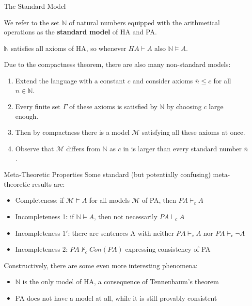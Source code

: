 \documentclass[xcolor=dvipsnames,aspectratio=169,handout]{beamer}
\newcommand{\MM}{\mathcal{M}}
\begin{document}
\begin{frame}{The Standard Model}
	\pause
	\begin{definition}
		We refer to the set $\mathbb N$ of natural numbers equipped with the arithmetical operations as the \textbf{standard model} of HA and PA.
	\end{definition}
	
	\pause
	\begin{fact}
		$\mathbb N$ satisfies all axioms of HA, so whenever $HA\vdash A$ also $\mathbb N\vDash A$.
	\end{fact}
	
	\pause
	\vspace{0.3cm}
	Due to the compactness theorem, there are also many non-standard models:
	\begin{enumerate}
		\pause
		\item
		Extend the language with a constant $c$ and consider axioms $\overline n\le c$ for all $n\in \mathbb N$.
		\pause
		\item
		Every finite set $\Gamma$ of these axioms is satisfied by $\mathbb N$ by choosing $c$ large enough.
		\pause
		\item
		Then by compactness there is a model $\MM$ satisfying all these axioms at once.
		\pause
		\item
		Observe that $\MM$ differs from $\mathbb N$ as $c$ in is larger than every standard number $\overline n$.
	\end{enumerate}
\end{frame}

\begin{frame}{Meta-Theoretic Properties}
	\pause
	Some standard (but potentially confusing) meta-theoretic results are:
	\begin{itemize}
		\pause
		\item
		Completeness: if $\MM\vDash A$ for all models $\MM$ of PA, then $PA\vdash_c A$
		\pause
		\item
		Incompleteness 1: if $\mathbb N \vDash A$, then not necessarily $PA\vdash_c A$
		\pause
		\item
		Incompleteness $1'$: there are sentences A with neither $PA\vdash_c A$ nor $PA\vdash_c \neg A$
		\pause
		\item
		Incompleteness 2: $PA\not\vdash_c Con(PA)$ expressing consistency of PA
	\end{itemize}
	
	\pause
	\vspace{0.5cm}
	Constructively, there are some even more interesting phenomena:
	\begin{itemize}
		\pause
		\item
		$\mathbb N$ is the only model of HA, a consequence of Tennenbaum's theorem
		\pause
		\item
		PA does not have a model at all, while it is still provably consistent
	\end{itemize}
\end{frame}
\end{document}
